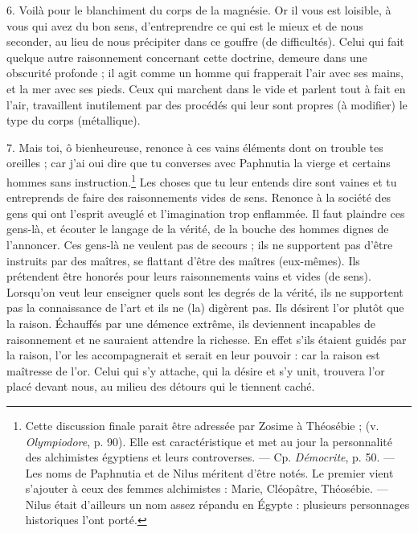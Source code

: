 \documentclass[landscape, a4paper, 11pt, oneside, polutonikogreek, french]{article}
\begin{document}
6. Voilà pour le blanchiment du corps de la magnésie. Or il vous est loisible, à vous qui avez du bon sens, d'entreprendre ce qui est le mieux et de nous seconder, au lieu de nous précipiter dans ce gouffre (de difficultés). Celui qui fait quelque autre raisonnement concernant cette doctrine, demeure dans une obscurité profonde ; il agit comme un homme qui frapperait l'air avec ses mains, et la mer avec ses pieds. Ceux qui marchent dans le vide et parlent tout à fait en l'air, travaillent inutilement par des procédés qui leur sont propres (à modifier) le type du corps (métallique).

7. Mais toi, ô bienheureuse, renonce à ces vains éléments dont on trouble tes oreilles ; car j'ai oui dire que tu converses avec Paphnutia la vierge et certains hommes sans instruction.\footnote{Cette discussion finale parait être adressée par Zosime à Théosébie ; (v. \emph{Olympiodore}, p. 90). Elle est caractéristique et met au jour la personnalité des alchimistes égyptiens et leurs controverses. --- Cp. \emph{Démocrite}, p. 50. --- Les noms de Paphnutia et de Nilus méritent d'être notés. Le premier vient s'ajouter à ceux des femmes alchimistes : Marie, Cléopâtre, Théosébie. --- Nilus était d'ailleurs un nom assez répandu en Égypte : plusieurs personnages historiques l'ont porté.} Les choses que tu leur entends dire sont vaines et tu entreprends de faire des raisonnements vides de sens. Renonce à la société des gens qui ont l'esprit aveuglé et l'imagination trop enflammée. Il faut plaindre ces gens-là, et écouter le langage de la vérité, de la bouche des hommes dignes de l'annoncer. Ces gens-là ne veulent pas de secours ; ils ne supportent pas d'être instruits par des maîtres, se flattant d'être des maîtres (eux-mêmes). Ils prétendent être honorés pour leurs raisonnements vains et vides (de sens). Lorsqu'on veut leur enseigner quels sont les degrés de la vérité, ils ne supportent pas la connaissance de l'art et ils ne (la) digèrent pas. Ils désirent l'or plutôt que la raison. Échauffés par une démence extrême, ils deviennent incapables de raisonnement et ne sauraient attendre la richesse. En effet s'ils étaient guidés par la raison, l'or les accompagnerait et serait en leur pouvoir : car la raison est maîtresse de l'or. Celui qui s'y attache, qui la désire et s'y unit, trouvera l'or placé devant nous, au milieu des détours qui le tiennent caché.
\end{document}

